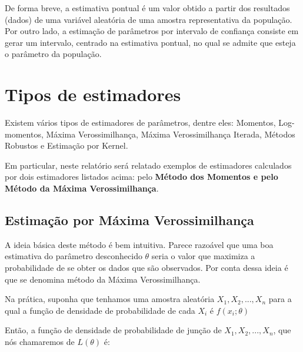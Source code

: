 De forma breve, a estimativa pontual é um valor obtido a partir dos resultados (dados) de uma variável aleatória de uma amostra representativa da população. Por outro lado, a estimação de parâmetros por intervalo de confiança consiste em gerar um intervalo, centrado na estimativa pontual, no qual se admite que esteja o parâmetro da população.






\section{Tipos de estimadores}

Existem vários tipos de estimadores de parâmetros, dentre eles: Momentos, Log-momentos, Máxima Verossimilhança, Máxima Verossimilhança Iterada, Métodos Robustos e Estimação por Kernel.

Em particular, neste relatório será relatado exemplos de estimadores calculados por dois estimadores listados acima: pelo \textbf{Método dos Momentos e pelo Método da Máxima Verossimilhança}.


\subsection{Estimação por Máxima Verossimilhança}

A ideia básica deste método é bem intuitiva. Parece razoável que uma boa estimativa do parâmetro desconhecido  \begin{math} \theta \end{math}
 seria o valor que maximiza a probabilidade de se obter os dados que são observados. Por conta dessa ideia é que se denomina método da Máxima Verossimilhança. 
 
Na prática, suponha que tenhamos uma amostra aleatória \begin{math} X_{1}, X_{2}, ..., X_{n} \end{math}
para a qual a função de densidade de probabilidade de cada \begin{math} X_{i} \end{math} é \begin{math} f(x_{i}; \theta)\end{math} 

Então, a função de densidade de probabilidade de junção  de \begin{math} X_{1}, X_{2}, ..., X_{n} \end{math}, que nós chamaremos de \begin{math} L(\theta) \end{math} é:

